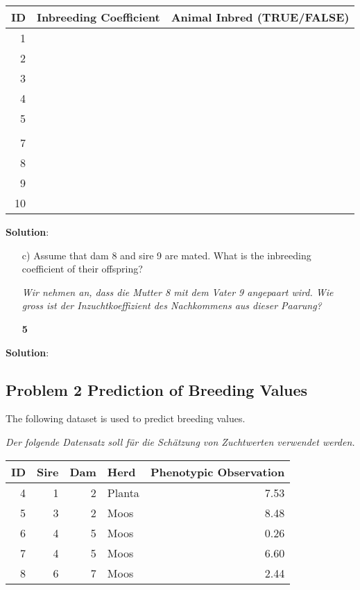 \documentclass[
]{article}
\newcommand{\points}[1]
{\begin{flushright}\textbf{#1}\end{flushright}}
\newcommand{\solstart}
{\vspace{3ex}\textbf{Solution}:}
\begin{document}
\begin{tabular}{rll}
\toprule
ID & Inbreeding Coefficient & Animal Inbred (TRUE/FALSE)\\
\midrule
1 &  & \\
2 &  & \\
3 &  & \\
4 &  & \\
5 &  & \\
\addlinespace
6 &  & \\
7 &  & \\
8 &  & \\
9 &  & \\
10 &  & \\
\bottomrule
\end{tabular}

\solstart

\clearpage
\pagebreak

\begin{enumerate}
\item[c)] Assume that dam 8 and sire 9 are mated. What is the inbreeding coefficient of their offspring?   

\textit{Wir nehmen an, dass die Mutter 8 mit dem Vater 9 angepaart wird. Wie gross ist der Inzuchtkoeffizient des Nachkommens aus dieser Paarung?}
\points{5}
\end{enumerate}

\solstart

\clearpage
\pagebreak

\hypertarget{problem-2-prediction-of-breeding-values}{%
\subsection{Problem 2 Prediction of Breeding
Values}\label{problem-2-prediction-of-breeding-values}}

The following dataset is used to predict breeding values.

\textit{Der folgende Datensatz soll für die Schätzung von Zuchtwerten verwendet werden.}

\begin{tabular}{rrrlr}
\toprule
ID & Sire & Dam & Herd & Phenotypic Observation\\
\midrule
4 & 1 & 2 & Planta & 7.53\\
5 & 3 & 2 & Moos & 8.48\\
6 & 4 & 5 & Moos & 0.26\\
7 & 4 & 5 & Moos & 6.60\\
8 & 6 & 7 & Moos & 2.44\\
\bottomrule
\end{tabular}
\end{document}
